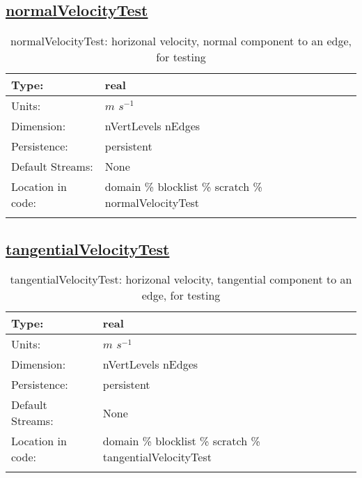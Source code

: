\subsection[normalVelocityTest]{\hyperref[sec:var_tab_scratch]{normalVelocityTest}}
\label{subsec:var_sec_scratch_normalVelocityTest}
\begin{center}
\begin{longtable}{| p{2.0in} | p{4.0in} |}
        \hline 
        Type: & real \\
        \hline 
        Units: & $m$ $s^{-1}$ \\
        \hline 
        Dimension: & nVertLevels nEdges \\
        \hline 
        Persistence: & persistent \\
        \hline 
		 Default Streams: & None \\
        \hline 
		 Location in code: & domain \% blocklist \% scratch \% normalVelocityTest \\
		 \hline 
    \caption{normalVelocityTest: horizonal velocity, normal component to an edge, for testing}
\end{longtable}
\end{center}
\subsection[tangentialVelocityTest]{\hyperref[sec:var_tab_scratch]{tangentialVelocityTest}}
\label{subsec:var_sec_scratch_tangentialVelocityTest}
\begin{center}
\begin{longtable}{| p{2.0in} | p{4.0in} |}
        \hline 
        Type: & real \\
        \hline 
        Units: & $m$ $s^{-1}$ \\
        \hline 
        Dimension: & nVertLevels nEdges \\
        \hline 
        Persistence: & persistent \\
        \hline 
		 Default Streams: & None \\
        \hline 
		 Location in code: & domain \% blocklist \% scratch \% tangentialVelocityTest \\
		 \hline 
    \caption{tangentialVelocityTest: horizonal velocity, tangential component to an edge, for testing}
\end{longtable}
\end{center}
